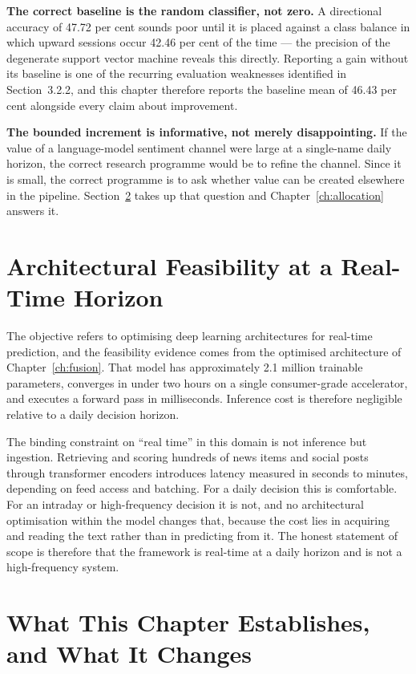 \textbf{The correct baseline is the random classifier, not zero.} A directional accuracy of 47.72
per cent sounds poor until it is placed against a class balance in which upward sessions occur
42.46 per cent of the time --- the precision of the degenerate support vector machine reveals this
directly. Reporting a gain without its baseline is one of the recurring evaluation weaknesses
identified in Section~3.2.2, and this chapter therefore reports the baseline mean of 46.43 per cent
alongside every claim about improvement.

\textbf{The bounded increment is informative, not merely disappointing.} If the value of a
language-model sentiment channel were large at a single-name daily horizon, the correct research
programme would be to refine the channel. Since it is small, the correct programme is to ask
whether value can be created elsewhere in the pipeline. Section~\ref{sec:llm-implication} takes up
that question and Chapter~\ref{ch:allocation} answers it.

\section{Architectural Feasibility at a Real-Time Horizon}
\label{sec:llm-feasibility}

The objective refers to optimising deep learning architectures for real-time prediction, and the
feasibility evidence comes from the optimised architecture of Chapter~\ref{ch:fusion}. That model
has approximately 2.1 million trainable parameters, converges in under two hours on a single
consumer-grade accelerator, and executes a forward pass in milliseconds. Inference cost is
therefore negligible relative to a daily decision horizon.

The binding constraint on ``real time'' in this domain is not inference but ingestion. Retrieving
and scoring hundreds of news items and social posts through transformer encoders introduces
latency measured in seconds to minutes, depending on feed access and batching. For a daily
decision this is comfortable. For an intraday or high-frequency decision it is not, and no
architectural optimisation within the model changes that, because the cost lies in acquiring and
reading the text rather than in predicting from it. The honest statement of scope is therefore
that the framework is real-time at a daily horizon and is not a high-frequency system.

\section{What This Chapter Establishes, and What It Changes}
\label{sec:llm-implication}

